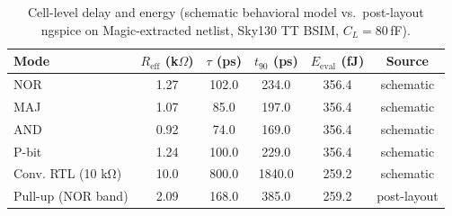 \begin{table}[ht]
\centering
\caption{Cell-level delay and energy (schematic behavioral model vs.\ post-layout ngspice on Magic-extracted netlist, Sky130 TT BSIM, $C_L=80$\,fF).}
\label{tbl:delay_energy}
\begin{tabular}{@{}lccccc@{}}
\toprule
Mode & $R_{\mathrm{eff}}$ (k$\Omega$) & $\tau$ (ps) & $t_{90}$ (ps) & $E_{\mathrm{eval}}$ (fJ) & Source \\
\midrule
NOR & 1.27 & 102.0 & 234.0 & 356.4 & schematic \\
MAJ & 1.07 & 85.0 & 197.0 & 356.4 & schematic \\
AND & 0.92 & 74.0 & 169.0 & 356.4 & schematic \\
P-bit & 1.24 & 100.0 & 229.0 & 356.4 & schematic \\
Conv. RTL (10 kΩ) & 10.0 & 800.0 & 1840.0 & 259.2 & schematic \\
\midrule
Pull-up (NOR band) & 2.09 & 168.0 & 385.0 & 259.2 & post-layout \\
\bottomrule
\end{tabular}
\end{table}
